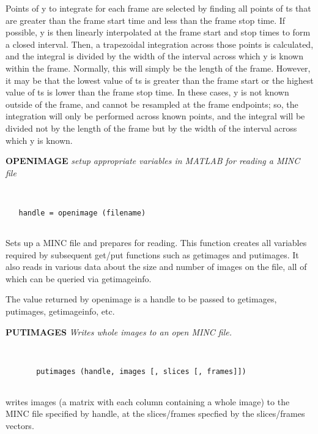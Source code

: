   Points of y to integrate for each frame are selected by finding all
  points of ts that are greater than the frame start time and less than
  the frame stop time.  If possible, y is then linearly interpolated at
  the frame start and stop times to form a closed interval.  Then, a
  trapezoidal integration across those points is calculated, and the
  integral is divided by the width of the interval across which y
  is known within the frame.  Normally, this will simply be the length
  of the frame.  However, it may be that the lowest value of ts is
  greater than the frame start or the highest value of ts is lower than
  the frame stop time.  In these cases, y is not known outside of the
  frame, and cannot be resampled at the frame endpoints; so, the integration
  will only be performed across known points, and the integral will
  be divided not by the length of the frame but by the width of the interval
  across which y is known.
\endfunchelp


{\large\bf OPENIMAGE} {\em   setup appropriate variables in MATLAB for reading a MINC file}
\begin{verbatim}


   handle = openimage (filename)


\end{verbatim}

   Sets up a MINC file and prepares for reading.  This function
   creates all variables required by subsequent get/put functions such
   as getimages and putimages.  It also reads in various data about
   the size and number of images on the file, all of which can be
   queried via getimageinfo.
 
   The value returned by openimage is a handle to be passed to getimages,
   putimages, getimageinfo, etc.
\endfunchelp


{\large\bf PUTIMAGES} {\em  Writes whole images to an open MINC file.}
\begin{verbatim}


       putimages (handle, images [, slices [, frames]])


\end{verbatim}

   writes images (a matrix with each column containing a whole image)
   to the MINC file specified by handle, at the slices/frames specfied
   by the slices/frames vectors.
 
